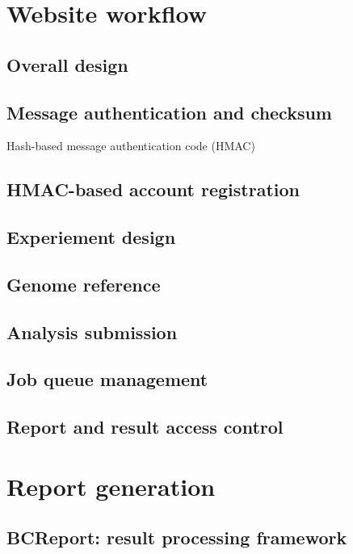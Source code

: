 \section{Website workflow}



\subsection{Overall design}

\subsection{Message authentication and checksum}

Hash-based message authentication code (HMAC)

\subsection{HMAC-based account registration}

\subsection{Experiement design}

\subsection{Genome reference}

\subsection{Analysis submission}

\subsection{Job queue management}

\subsection{Report and result access control}



\section{Report generation}

\subsection{BCReport: result processing framework}




